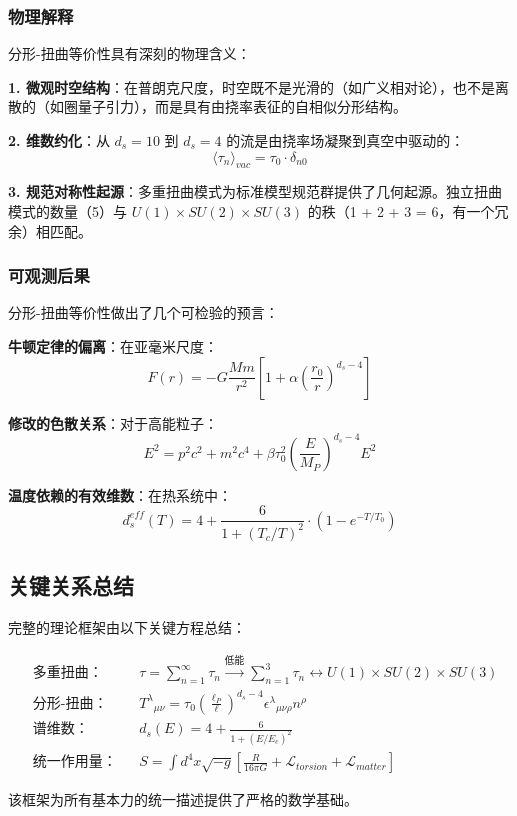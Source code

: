 \subsubsection{物理解释}

分形-扭曲等价性具有深刻的物理含义：

\textbf{1. 微观时空结构}：在普朗克尺度，时空既不是光滑的（如广义相对论），也不是离散的（如圈量子引力），而是具有由挠率表征的自相似分形结构。

\textbf{2. 维数约化}：从 $d_s = 10$ 到 $d_s = 4$ 的流是由挠率场凝聚到真空中驱动的：
\begin{equation}
    \langle \tau_n \rangle_{vac} = \tau_0 \cdot \delta_{n0}
\end{equation}

\textbf{3. 规范对称性起源}：多重扭曲模式为标准模型规范群提供了几何起源。独立扭曲模式的数量（5）与 $U(1) \times SU(2) \times SU(3)$ 的秩（1 + 2 + 3 = 6，有一个冗余）相匹配。

\subsubsection{可观测后果}

分形-扭曲等价性做出了几个可检验的预言：

\textbf{牛顿定律的偏离}：在亚毫米尺度：
\begin{equation}
    F(r) = -G\frac{Mm}{r^2}\left[1 + \alpha\left(\frac{r_0}{r}\right)^{d_s - 4}\right]
\end{equation}

\textbf{修改的色散关系}：对于高能粒子：
\begin{equation}
    E^2 = p^2c^2 + m^2c^4 + \beta \tau_0^2 \left(\frac{E}{M_P}\right)^{d_s - 4} E^2
\end{equation}

\textbf{温度依赖的有效维数}：在热系统中：
\begin{equation}
    d_s^{eff}(T) = 4 + \frac{6}{1 + (T_c/T)^2} \cdot \left(1 - e^{-T/T_0}\right)
\end{equation}

\subsection{关键关系总结}

完整的理论框架由以下关键方程总结：

\begin{align}
    &\text{多重扭曲：} && \tau = \sum_{n=1}^{\infty} \tau_n \xrightarrow{低能} \sum_{n=1}^{3} \tau_n \leftrightarrow U(1) \times SU(2) \times SU(3) \\[1em]
    &\text{分形-扭曲：} && T^{\lambda}{}_{\mu\nu} = \tau_0 \left(\frac{\ell_P}{\ell}\right)^{d_s - 4} \epsilon^{\lambda}{}_{\mu\nu\rho} n^{\rho} \\[1em]
    &\text{谱维数：} && d_s(E) = 4 + \frac{6}{1 + (E/E_c)^2} \\[1em]
    &\text{统一作用量：} && S = \int d^4x \sqrt{-g} \left[\frac{R}{16\pi G} + \mathcal{L}_{torsion} + \mathcal{L}_{matter}\right]
\end{align}

该框架为所有基本力的统一描述提供了严格的数学基础。
